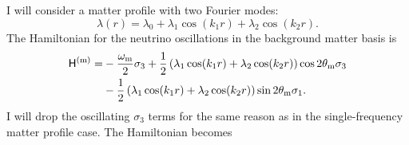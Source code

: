 I will consider a matter profile with two Fourier modes:
\begin{equation}
    \lambda(r) = \lambda_0 + \lambda_1 \cos (k_1 r) + \lambda_2 \cos (k_2 r).
\end{equation}
The Hamiltonian for the neutrino oscillations in the background matter basis is
\begin{align}
  \mathsf H^{(\mm)} =& - \frac{\omega_\mm}{2}\sigma_3  + \frac{1}{2} \left( \lambda_1 \cos(k_1 r) + \lambda_2 \cos(k_2 r) \right) \cos 2\theta_\mm \sigma_3 \nonumber\\
   &- \frac{1}{2} \left( \lambda_1 \cos(k_1 r) + \lambda_2 \cos(k_2 r)\right)\sin 2\theta_\mm \sigma_1.
  \label{eq-hamiltonian-bg-matter-basis-multi-frequency}
\end{align}
I will drop the oscillating $\sigma_3$ terms for the same reason as in the single-frequency matter profile case. The Hamiltonian becomes
